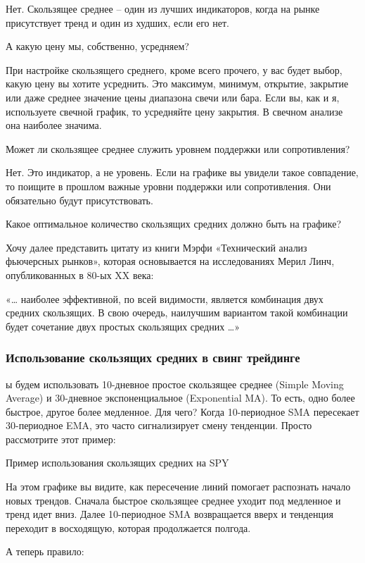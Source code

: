 \documentclass{book}
\begin{document}
Нет. Скользящее среднее – один из лучших индикаторов, когда на рынке присутствует тренд и один из худших, если его нет.

А какую цену мы, собственно, усредняем?

При настройке скользящего среднего, кроме всего прочего, у вас будет выбор, какую цену вы хотите усреднить. Это максимум, минимум, открытие, закрытие или даже среднее значение цены диапазона свечи или бара. Если вы, как и я, используете свечной график, то усредняйте цену закрытия. В свечном анализе она наиболее значима.

Может ли скользящее среднее служить уровнем поддержки или сопротивления?

Нет. Это индикатор, а не уровень. Если на графике вы увидели такое совпадение, то поищите в прошлом важные уровни поддержки или сопротивления. Они обязательно будут присутствовать.

Какое оптимальное количество скользящих средних должно быть на графике?

Хочу далее представить цитату из книги Мэрфи «Технический анализ фьючерсных рынков», которая основывается на исследованиях Мерил Линч, опубликованных в 80-ых XX века:

    «… наиболее эффективной, по всей видимости, является комбинация
    двух средних скользящих. В свою очередь, наилучшим вариантом такой
    комбинации будет сочетание двух простых скользящих средних …»

\subsubsection{Использование скользящих средних в свинг трейдинге }

ы будем использовать 10-дневное простое скользящее среднее  (Simple Moving Average) и 30-дневное экспоненциальное (Exponential MA). То есть, одно более быстрое, другое более медленное. Для чего? Когда 10-периодное SMA пересекает 30-периодное EMA, это часто сигнализирует смену тенденции. Просто рассмотрите этот пример:

Пример использования скользящих средних на SPY

На этом графике вы видите, как пересечение линий помогает распознать начало новых трендов. Сначала быстрое скользящее среднее уходит под медленное и тренд идет вниз. Далее 10-периодное SMA возвращается вверх и тенденция переходит в восходящую, которая продолжается полгода.

А теперь правило:
\end{document}
